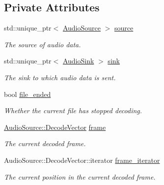 \subsection*{Private Attributes}
\begin{DoxyCompactItemize}
\item 
\hypertarget{classAudio_a0efa7be67424d967c551ecc82cda02eb}{std\+::unique\+\_\+ptr$<$ \hyperlink{classAudioSource}{Audio\+Source} $>$ \hyperlink{classAudio_a0efa7be67424d967c551ecc82cda02eb}{source}}\label{classAudio_a0efa7be67424d967c551ecc82cda02eb}

\begin{DoxyCompactList}\small\item\em The source of audio data. \end{DoxyCompactList}\item 
\hypertarget{classAudio_ae7dddd283486a0d1555e9bc6a0d63cff}{std\+::unique\+\_\+ptr$<$ \hyperlink{classAudioSink}{Audio\+Sink} $>$ \hyperlink{classAudio_ae7dddd283486a0d1555e9bc6a0d63cff}{sink}}\label{classAudio_ae7dddd283486a0d1555e9bc6a0d63cff}

\begin{DoxyCompactList}\small\item\em The sink to which audio data is sent. \end{DoxyCompactList}\item 
\hypertarget{classAudio_acec4f6ef3a89f170bdaed5670efd092c}{bool \hyperlink{classAudio_acec4f6ef3a89f170bdaed5670efd092c}{file\+\_\+ended}}\label{classAudio_acec4f6ef3a89f170bdaed5670efd092c}

\begin{DoxyCompactList}\small\item\em Whether the current file has stopped decoding. \end{DoxyCompactList}\item 
\hypertarget{classAudio_a0c734b8fe7eb8f80b3985ee0c638f982}{\hyperlink{classAudioSource_a836c61e348dbe7df6ba255669c015303}{Audio\+Source\+::\+Decode\+Vector} \hyperlink{classAudio_a0c734b8fe7eb8f80b3985ee0c638f982}{frame}}\label{classAudio_a0c734b8fe7eb8f80b3985ee0c638f982}

\begin{DoxyCompactList}\small\item\em The current decoded frame. \end{DoxyCompactList}\item 
\hypertarget{classAudio_a9d605091cc66ccfe9f5ae149c9181ba4}{Audio\+Source\+::\+Decode\+Vector\+::iterator \hyperlink{classAudio_a9d605091cc66ccfe9f5ae149c9181ba4}{frame\+\_\+iterator}}\label{classAudio_a9d605091cc66ccfe9f5ae149c9181ba4}

\begin{DoxyCompactList}\small\item\em The current position in the current decoded frame. \end{DoxyCompactList}\end{DoxyCompactItemize}


